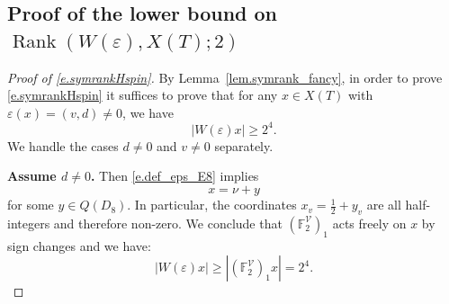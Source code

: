 \documentclass[12pt]{amsart}
\numberwithin{equation}{section}
\theoremstyle{definition}
\newcommand{\cV}{\mathcal{V}}
\newcommand{\bF}{\mathbb{F}}
\newcommand{\SymRank}{\operatorname{Rank}}
\newcommand{\eps}{\varepsilon}
\begin{document}
\subsection*{Proof of the lower bound on \texorpdfstring{$\SymRank(W(\eps),X(T);2)$}{the symmetric rank}}
\begin{proof}[Proof of \eqref{e.symrankHspin}]
     By Lemma~\ref{lem.symrank_fancy}, in order to prove \eqref{e.symrankHspin} it suffices to prove that for any $x\in X(T)$ with $\eps(x) = (v,d)\neq 0$, we have $$|W(\eps) x| \geq 2^4.$$
    We handle the cases $d\neq 0$ and $v\neq 0$ separately.

\smallskip
    \textbf{Assume $d\neq 0$.} Then \eqref{e.def_eps_E8} implies $$x = \nu +y$$ for some $y\in Q(D_8)$. In particular, the coordinates $x_v= \frac{1}{2}+y_v$ are all half-integers and therefore non-zero. We conclude that $(\bF_2^\cV)_1$ acts freely on $x$ by sign changes and we have:
        $$|W(\eps) x | \geq |(\bF_2^\cV)_1 x| = 2^4.$$


\end{proof}
\end{document}
